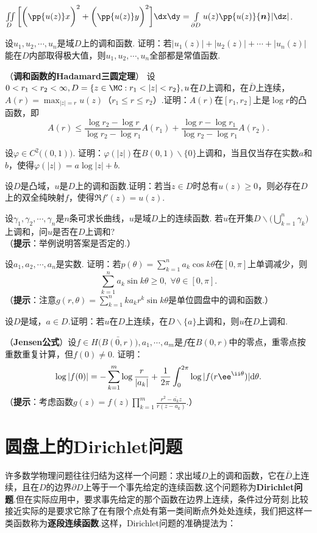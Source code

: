 \begin{xiti}
\begin{enuma}
  \item $\iint\limits_D\bigg[\bigg(\pp{u(z)}x\bigg)^2+\bigg(\pp{u(z)}y\bigg)^2\bigg]
  \dx\dy=\int\limits_{\partial D}u(z)\pp{u(z)}{\boldsymbol n}|\dz|$.
\end{enuma}
\item 设$u_1,u_2,\cdots,u_n$是域$D$上的调和函数. 证明：若$|u_1(z)|+|u_2(z)|+\cdots+|u_n(z)|$能在$D$内部取得极大值，则$u_1,u_2,\cdots,u_n$全部都是常值函数.
\item （\textbf{调和函数的Hadamard三圆定理}）
设$0<r_1<r_2<\infty,D=\{z\in\MC:r_1<|z|<r_2\},u$在$D$上调和，在$\bar D$上连续，$A(r)=\max_{|z|=r}u(z)$（$r_1\le r\le r_2$）.证明：$A(r)$在$[r_1,r_2]$上是$\log r$的凸函数，即
\[A(r)\le\frac{\log r_2-\log r}{\log r_2-\log r_1}A(r_1)+\frac{\log r-\log r_1}
{\log r_2-\log r_1}A(r_2).\]
\item 设$\varphi\in C^2\big((0,1)\big)$. 证明：$\varphi(|z|)$在$B(0,1)\backslash\{0\}$上调和，当且仅当存在实数$a$和$b$，使得$\varphi(|z|)=a\log|z|+b$.
\item 设$D$是凸域，$u$是$D$上的调和函数.证明：若当$z\in D$时总有$u(z)\ge0$，则必存在$D$上的双全纯映射$f$，使得$\Re f'(z)=u(z)$.
\item 设$\gamma_1,\gamma_2,\cdots,\gamma_n$是$n$条可求长曲线，$u$是域$D$上的连续函数. 若$u$在开集$D\backslash\big(\bigcup_{k=1}^n\gamma_k\big)$上调和，问$u$是否在$D$上调和?\\
（\textbf{提示}：举例说明答案是否定的.）
\item 设$a_1,a_2,\cdots,a_n$是实数. 证明：若$p(\theta)=\sum_{k=1}^na_k\cos k\theta$在$[0,\pi]$上单调减少，则
    \[\sum_{k=1}^n a_k\sin k\theta\ge0,\;\forall \theta\in[0,\pi].\]
（\textbf{提示}：注意$g(r,\theta)=\sum_{k=1}^nka_kr^k\sin k\theta$是单位圆盘中的调和函数.）
\item 设$D$是域，$a\in D$.证明：若$u$在$D$上连续，在$D\backslash\{a\}$上调和，则$u$在$D$上调和.
\item （\textbf{Jensen公式}）设$f\in H\big(\bar{B(0,r)}\big),a_1,\cdots,a_m$是$f$在$B(0,r)$中的零点，重零点按重数重复计算，但$f(0)\ne0$. 证明：
\[\log|f(0)|=-\sum_{k=1}^m\log\frac r{|a_k|}+\frac1{2\pi}\int_0^{2\pi}
\log|f(r\ee^{\ii\theta})|\textrm d\theta.\]
（\textbf{提示}：考虑函数$g(z)=f(z)\prod_{k=1}^m\frac{r^2-\bar{a_k}z}{r(z-a_k)}$.）
\end{xiti}

\section{圆盘上的Dirichlet问题\label{sec8.2}}
许多数学物理问题往往归结为这样一个问题：求出域$D$上的调和函数，它在$\bar D$上连续，且在$D$的边界$\partial D$上等于一个事先给定的连续函数.这个问题称为\textbf{Dirichlet问题}.但在实际应用中，要求事先给定的那个函数在边界上连续，条件过分苛刻.比较接近实际的是要求它除了在有限个点处有第一类间断点外处处连续，我们把这样一类函数称为\textbf{逐段连续函数}.这样，Dirichlet问题的准确提法为：

